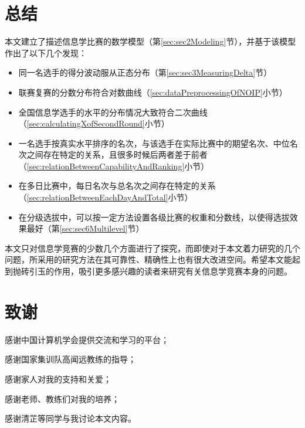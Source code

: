 \newpage

\section{总结}

    本文建立了描述信息学比赛的数学模型（第\ref{sec:sec2Modeling}节），并基于该模型作出了以下几个发现：
    \begin{itemize}[leftmargin=4em]
        \item 同一名选手的得分波动服从正态分布（第\ref{sec:sec3MeasuringDelta}节）
        \item 联赛复赛的分数分布符合对数曲线（\ref{sec:dataPreprocessingOfNOIP}小节）
        \item 全国信息学选手的水平的分布情况大致符合二次曲线（\ref{sec:calculatingXofSecondRound}小节）
        \item 一名选手按真实水平排序的名次，与该选手在实际比赛中的期望名次、中位名次之间存在特定的关系，且很多时候后两者差于前者（\ref{sec:relationBetweenCapabilityAndRanking}小节）
        \item 在多日比赛中，每日名次与总名次之间存在特定的关系（\ref{sec:relationBetweenEachDayAndTotal}小节）
        \item 在分级选拔中，可以按一定方法设置各级比赛的权重和分数线，以使得选拔效果最好（第\ref{sec:sec6Multilevel}节）
    \end{itemize}

    \vspace{1.5ex}
    
    本文只对信息学竞赛的少数几个方面进行了探究，而即使对于本文着力研究的几个问题，所采用的研究方法在其可靠性、精确性上也有很大改进空间。希望本文能起到抛砖引玉的作用，吸引更多感兴趣的读者来研究有关信息学竞赛本身的问题。

\section{致谢}

    感谢中国计算机学会提供交流和学习的平台；

    感谢国家集训队高闻远教练的指导；

    感谢家人对我的支持和关爱；

    感谢老师、教练们对我的培养；

    感谢清芷等同学与我讨论本文内容。

